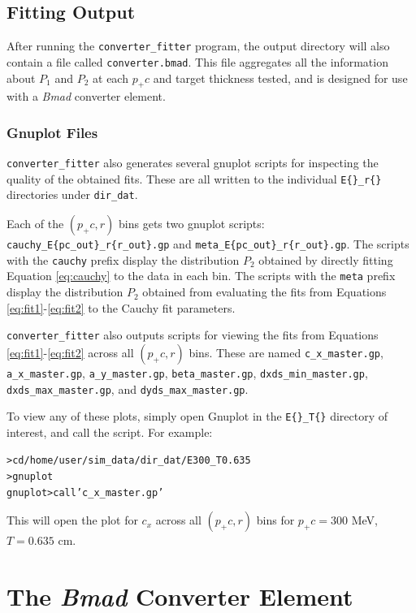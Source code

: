 \documentclass[12pt]{article}
\newcommand{\exef}{\texttt{converter\_fitter}\xspace}
\newcommand{\bmad}{\textit{Bmad}\xspace}
\newenvironment{example}
  {\vspace{-2.5ex} \begin{alltt}}
  {\end{alltt} \vspace{-2.2ex}}
\begin{document}
\subsection{Fitting Output}

After running the \exef program, the output directory will also contain a file called
\texttt{converter.bmad}.  This file aggregates all the information about $P_1$ and $P_2$ at each
$p_+ c$ and target thickness tested, and is designed for use with a \bmad converter element.

\subsubsection{Gnuplot Files}

\exef  also generates several gnuplot scripts for inspecting the quality of the obtained fits.
These are all written to the individual \texttt{E\{\}\_r\{\}} directories under \texttt{dir\_dat}.

Each of the $(p_+ c, r)$ bins gets two gnuplot scripts:
\texttt{cauchy\_E\{pc\_out\}\_r\{r\_out\}.gp} and \texttt{meta\_E\{pc\_out\}\_r\{r\_out\}.gp}.  The
scripts with the \texttt{cauchy} prefix display the distribution $P_2$ obtained by directly fitting
Equation \ref{eq:cauchy} to the data in each bin.  The scripts with the \texttt{meta} prefix display
the distribution $P_2$ obtained from evaluating the fits from Equations \ref{eq:fit1}-\ref{eq:fit2}
to the Cauchy fit parameters.

\exef also outputs scripts for viewing the fits from Equations \ref{eq:fit1}-\ref{eq:fit2} across
all $(p_+ c, r)$ bins.  These are named \texttt{c\_x\_master.gp}, \texttt{a\_x\_master.gp},
\texttt{a\_y\_master.gp}, \texttt{beta\_master.gp}, \texttt{dxds\_min\_master.gp},
\texttt{dxds\_max\_master.gp}, and \texttt{dyds\_max\_master.gp}.

To view any of these plots, simply open Gnuplot in the \texttt{E\{\}\_T\{\}} directory of interest,
and call the script.  For example:
\begin{example}
  > cd /home/user/sim_data/dir_dat/E300_T0.635
  > gnuplot
  gnuplot> call 'c_x_master.gp'
\end{example}
This will open the plot for $c_x$ across all $(p_+ c, r)$ bins for $p_+ c = 300$ MeV, $T = 0.635$ cm.

\newpage
\section{The \bmad  Converter Element}
\end{document}
